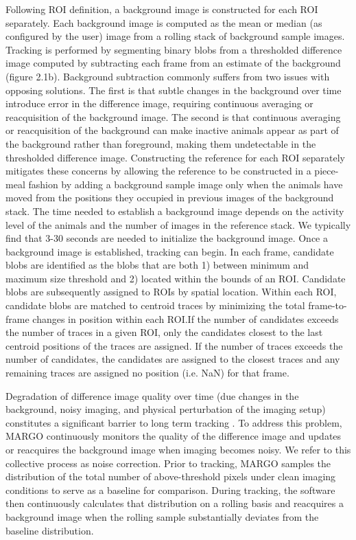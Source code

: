 \documentclass[12pt,letterpaper]{article}
\begin{document}
Following ROI definition, a background image is constructed for each ROI separately. Each background image is computed as the mean or median (as configured by the user) image from a rolling stack of background sample images. Tracking is performed by segmenting binary blobs from a thresholded difference image computed by subtracting each frame from an estimate of the background (figure 2.1b). Background subtraction commonly suffers from two issues with opposing solutions. The first is that subtle changes in the background over time introduce error in the difference image, requiring continuous averaging or reacquisition of the background image. The second is that continuous averaging or reacquisition of the background can make inactive animals appear as part of the background rather than foreground, making them undetectable in the thresholded difference image. Constructing the reference for each ROI separately mitigates these concerns by allowing the reference to be constructed in a piece-meal fashion by adding a background sample image only when the animals have moved from the positions they occupied in previous images of the background stack. The time needed to establish a background image depends on the activity level of the animals and the number of images in the reference stack. We typically find that 3-30 seconds are needed to initialize the background image. Once a background image is established, tracking can begin. In each frame, candidate blobs are identified as the blobs that are both 1) between minimum and maximum size threshold and 2) located within the bounds of an ROI. Candidate blobs are subsequently assigned to ROIs by spatial location. Within each ROI, candidate blobs are matched to centroid traces by minimizing the total frame-to-frame changes in position within each ROI.If the number of candidates exceeds the number of traces in a given ROI, only the candidates closest to the last centroid positions of the traces are assigned. If the number of traces exceeds the number of candidates, the candidates are assigned to the closest traces and any remaining traces are assigned no position (i.e. NaN) for that frame.

Degradation of difference image quality over time (due changes in the background, noisy imaging, and physical perturbation of the imaging setup) constitutes a significant barrier to long term tracking \cite{Sridhar_2019}. To address this problem, MARGO continuously monitors the quality of the difference image and updates or reacquires the background image when imaging becomes noisy. We refer to this collective process as noise correction. Prior to tracking, MARGO samples the distribution of the total number of above-threshold pixels under clean imaging conditions to serve as a baseline for comparison. During tracking, the software then continuously calculates that distribution on a rolling basis and reacquires a background image when the rolling sample substantially deviates from the baseline distribution.
\end{document}
